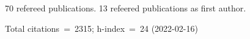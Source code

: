 70 refereed publications. 13 refeered publications as first author.

Total citations~=~2315; h-index~=~24 (2022-02-16)